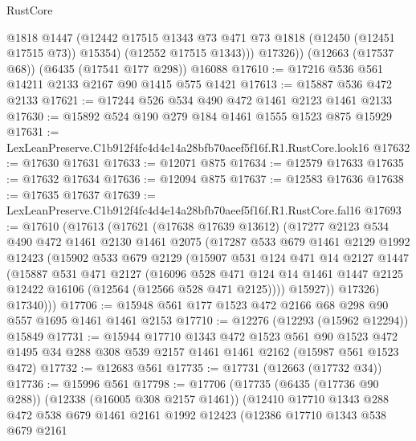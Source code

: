 \begin{lexlean}{RustCore}
\begin{coremodule}
            @1818
            @1447
            (@12442 @17515 @1343 @73 @471 @73 @1818 (@12450 (@12451 @17515 @73)) @15354)
            (@12552 @17515 @1343)))
        @17326))
    (@12663 (@17537 @68))
    (@6435 (@17541 @177 @298))
    @16088
@17610 := @17216 @536 @561 @14211 @2133 @2167 @90 @1415 @575 @1421
@17613 := @15887 @536 @472 @2133
@17621 := @17244 @526 @534 @490 @472 @1461 @2123 @1461 @2133
@17630 := @15892 @524 @190 @279 @184 @1461 @1555 @1523 @875 @15929
@17631 := LexLeanPreserve.C1b912f4fc4d4e14a28bfb70aeef5f16f.R1.RustCore.look16
@17632 := @17630 @17631
@17633 := @12071 @875
@17634 := @12579 @17633
@17635 := @17632 @17634
@17636 := @12094 @875
@17637 := @12583 @17636
@17638 := @17635 @17637
@17639 := LexLeanPreserve.C1b912f4fc4d4e14a28bfb70aeef5f16f.R1.RustCore.fal16
@17693 := @17610
    (@17613
      (@17621
        (@17638 @17639 @13612)
        (@17277
          @2123
          @534
          @490
          @472
          @1461
          @2130
          @1461
          @2075
          (@17287
            @533
            @679
            @1461
            @2129
            @1992
            @12423
            (@15902
              @533
              @679
              @2129
              (@15907
                @531
                @124
                @471
                @14
                @2127
                @1447
                (@15887
                  @531
                  @471
                  @2127
                  (@16096
                    @528
                    @471
                    @124
                    @14
                    @1461
                    @1447
                    @2125
                    @12422
                    @16106
                    (@12564 (@12566 @528 @471 @2125))))
                @15927))
            @17326)
          @17340)))
@17706 := @15948 @561 @177 @1523 @472 @2166 @68 @298 @90 @557 @1695 @1461 @1461 @2153
@17710 := @12276 (@12293 (@15962 @12294)) @15849
@17731 := @15944
    @17710
    @1343
    @472
    @1523
    @561
    @90
    @1523
    @472
    @1495
    @34
    @288
    @308
    @539
    @2157
    @1461
    @1461
    @2162
    (@15987 @561 @1523 @472)
@17732 := @12683 @561
@17735 := @17731 (@12663 (@17732 @34))
@17736 := @15996 @561
@17798 := @17706
    (@17735
      (@6435 (@17736 @90 @288))
      (@12338 (@16005 @308 @2157 @1461))
      (@12410
        @17710
        @1343
        @288
        @472
        @538
        @679
        @1461
        @2161
        @1992
        @12423
        (@12386
          @17710
          @1343
          @538
          @679
          @2161

\end{coremodule}
\end{lexlean}
